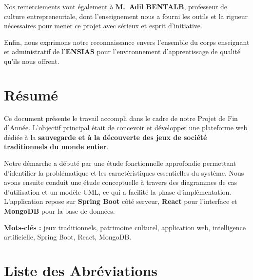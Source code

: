 \documentclass[12pt,a4paper]{report}
\begin{document}
Nos remerciements vont également à \textbf{M.~Adil BENTALB}, professeur de culture
entrepreneuriale, dont l'enseignement nous a fourni les outils et la rigueur nécessaires
pour mener ce projet avec sérieux et esprit d'initiative.

Enfin, nous exprimons notre reconnaissance envers l'ensemble du corps enseignant et
administratif de l'\textbf{ENSIAS} pour l'environnement d'apprentissage de qualité qu'ils
nous offrent.

\newpage
\chapter*{Résumé}
\thispagestyle{fancy}

Ce document présente le travail accompli dans le cadre de notre Projet de Fin d'Année.
L'objectif principal était de concevoir et développer une plateforme web dédiée à la
\textbf{sauvegarde et à la découverte des jeux de société traditionnels du monde entier}.

Notre démarche a débuté par une étude fonctionnelle approfondie permettant d'identifier
la problématique et les caractéristiques essentielles du système. Nous avons ensuite
conduit une étude conceptuelle à travers des diagrammes de cas d'utilisation et un
modèle UML, ce qui a facilité la phase d'implémentation. L'application repose sur
\textbf{Spring Boot} côté serveur, \textbf{React} pour l'interface et \textbf{MongoDB}
pour la base de données.

\medskip
\noindent\textbf{Mots-clés :} jeux traditionnels, patrimoine culturel, application web,
intelligence artificielle, Spring Boot, React, MongoDB.



\newpage
\chapter*{Liste des Abréviations}
\thispagestyle{fancy}
\end{document}
